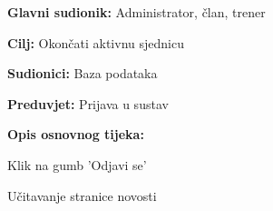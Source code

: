 					\noindent {}
					\begin{packed_item}
	
						\item \textbf{Glavni sudionik: } Administrator, član, trener
						\item  \textbf{Cilj: } Okončati aktivnu sjednicu
						\item  \textbf{Sudionici: } Baza podataka
						\item  \textbf{Preduvjet: } Prijava u sustav
						\item  \textbf{Opis osnovnog tijeka:}
						
						\item[] \begin{packed_enum}
	
							\item Klik na gumb 'Odjavi se'
							\item Učitavanje stranice novosti 
							
						\end{packed_enum}
					\end{packed_item}
				
					\eject
					
